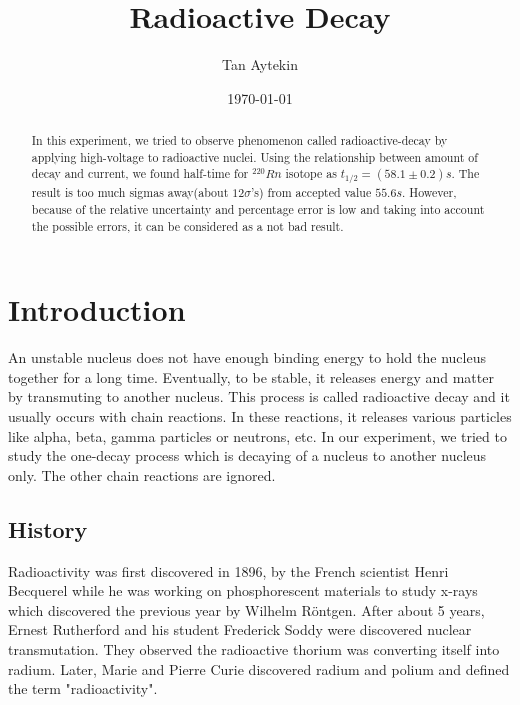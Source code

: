 \documentclass[reprint,amsmath,aps,nofootinbib,english]{revtex4-2}
\begin{document}
\title{Radioactive Decay}
\author{Tan Aytekin}
\date{\today}


\begin{abstract}
In this experiment, we tried to observe phenomenon called radioactive-decay by applying high-voltage to radioactive nuclei. Using the relationship between amount of decay and current, we found half-time for $^{220}Rn$ isotope as  $t_{1/2} = (58.1 \pm 0.2) s$. The result is too much sigmas away(about $12 \sigma$'s) from accepted value $55.6 s$. However, because of the relative uncertainty and percentage error is low and taking into account the possible errors, it can be considered as a not bad result. 


\end{abstract}

\maketitle

\section{Introduction}
An unstable nucleus does not have enough binding energy to hold the nucleus together for a long time. Eventually, to be stable, it releases energy and matter by transmuting to another nucleus. \cite{int1} This process is called radioactive decay and it usually occurs with chain reactions. In these reactions, it releases various particles like alpha, beta, gamma particles or neutrons, etc.\cite{int2} In our experiment, we tried to study the one-decay process which is decaying of a nucleus to another nucleus only.\cite{int3} The other chain reactions are ignored.


\subsection{History}
Radioactivity was first discovered in 1896, by the French scientist Henri Becquerel while he was working on phosphorescent materials to study x-rays which discovered the previous year by Wilhelm Röntgen.\cite{hist1} After about 5 years, Ernest Rutherford and his student Frederick Soddy were discovered nuclear transmutation. They observed the radioactive thorium was converting itself into radium.\cite{hist2} Later, Marie and Pierre Curie discovered radium and polium and defined the term "radioactivity".\cite{hist3}
\end{document}
